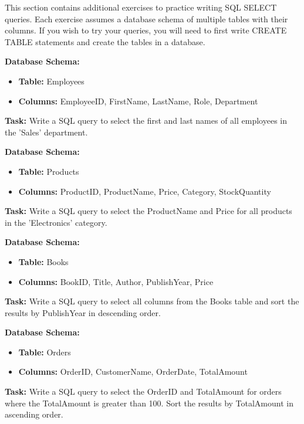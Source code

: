 This section contains additional exercises to practice writing SQL SELECT queries. Each exercise assumes a database schema of multiple tables with their columns. If you wish to try your queries, you will need to first write CREATE TABLE statements and create the tables in a database.

\begin{exercisebox}
\textbf{Database Schema:} 
\begin{itemize}
    \item \textbf{Table:} Employees
    \item \textbf{Columns:} EmployeeID, FirstName, LastName, Role, Department
\end{itemize}

\noindent \textbf{Task:} Write a SQL query to select the first and last names of all employees in the 'Sales' department. \\
\end{exercisebox}

\begin{exercisebox}
\noindent \textbf{Database Schema:}
\begin{itemize}
    \item \textbf{Table:} Products
    \item \textbf{Columns:} ProductID, ProductName, Price, Category, StockQuantity
\end{itemize}

\noindent \textbf{Task:} Write a SQL query to select the ProductName and Price for all products in the 'Electronics' category.\\
\end{exercisebox}

\begin{exercisebox}
\noindent \textbf{Database Schema:}
\begin{itemize}
    \item \textbf{Table:} Books
    \item \textbf{Columns:} BookID, Title, Author, PublishYear, Price
\end{itemize}

\noindent \textbf{Task:} Write a SQL query to select all columns from the Books table and sort the results by PublishYear in descending order.\\
\end{exercisebox}

\begin{exercisebox}
\noindent \textbf{Database Schema:}
\begin{itemize}
    \item \textbf{Table:} Orders
    \item \textbf{Columns:} OrderID, CustomerName, OrderDate, TotalAmount
\end{itemize}

\noindent \textbf{Task:} Write a SQL query to select the OrderID and TotalAmount for orders where the TotalAmount is greater than 100. Sort the results by TotalAmount in ascending order.
\end{exercisebox}

